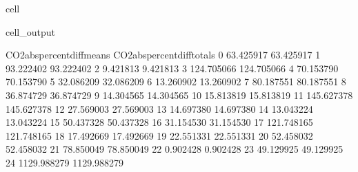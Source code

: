 \documentclass[letterpaper,10pt,english]{jupyterBook}
\begin{document}
\begin{sphinxuseclass}{cell}
\begin{sphinxVerbatimOutput}
\begin{sphinxuseclass}{cell_output}
\begin{sphinxVerbatim}[commandchars=\\\{\}]
    CO2\PYGZus{}abs\PYGZus{}percent\PYGZus{}diff\PYGZus{}means  CO2\PYGZus{}abs\PYGZus{}percent\PYGZus{}diff\PYGZus{}totals  \PYGZbs{}
0                    63.425917                    63.425917   
1                    93.222402                    93.222402   
2                     9.421813                     9.421813   
3                   124.705066                   124.705066   
4                    70.153790                    70.153790   
5                    32.086209                    32.086209   
6                    13.260902                    13.260902   
7                    80.187551                    80.187551   
8                    36.874729                    36.874729   
9                    14.304565                    14.304565   
10                   15.813819                    15.813819   
11                  145.627378                   145.627378   
12                   27.569003                    27.569003   
13                   14.697380                    14.697380   
14                   13.043224                    13.043224   
15                   50.437328                    50.437328   
16                   31.154530                    31.154530   
17                  121.748165                   121.748165   
18                   17.492669                    17.492669   
19                   22.551331                    22.551331   
20                   52.458032                    52.458032   
21                   78.850049                    78.850049   
22                    0.902428                     0.902428   
23                   49.129925                    49.129925   
24                 1129.988279                  1129.988279   


\end{sphinxVerbatim}
\end{sphinxuseclass}
\end{sphinxVerbatimOutput}
\end{sphinxuseclass}
\end{document}
